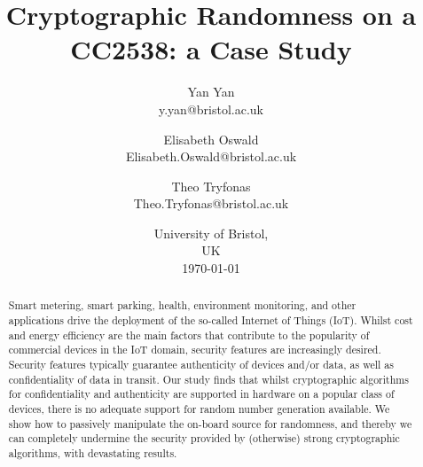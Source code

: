 \documentclass{article}
\title{Cryptographic Randomness on a CC2538: a Case Study}
\author{ 
Yan Yan \\ 
y.yan@bristol.ac.uk
\and
Elisabeth Oswald \\ 
Elisabeth.Oswald@bristol.ac.uk
\and
Theo Tryfonas \\ 
Theo.Tryfonas@bristol.ac.uk
}
\date{University of Bristol, \\ UK \\ \today}
\begin{document}
\maketitle

\begin{abstract}
Smart metering, smart parking, health, environment monitoring, and other applications drive the deployment of the so-called Internet of Things (IoT). Whilst cost and energy efficiency are the main factors that contribute to the popularity of commercial devices in the IoT domain, security features are increasingly desired. Security features typically guarantee authenticity of devices and/or data, as well as confidentiality of data in transit. Our study finds that whilst cryptographic algorithms for confidentiality and authenticity are supported in hardware on a popular class of devices, there is no adequate support for random number generation available. We show how to passively manipulate the on-board source for randomness, and thereby we can completely undermine the security provided by (otherwise) strong cryptographic algorithms, with devastating results. 
\end{abstract}









\appendix

\end{document}
